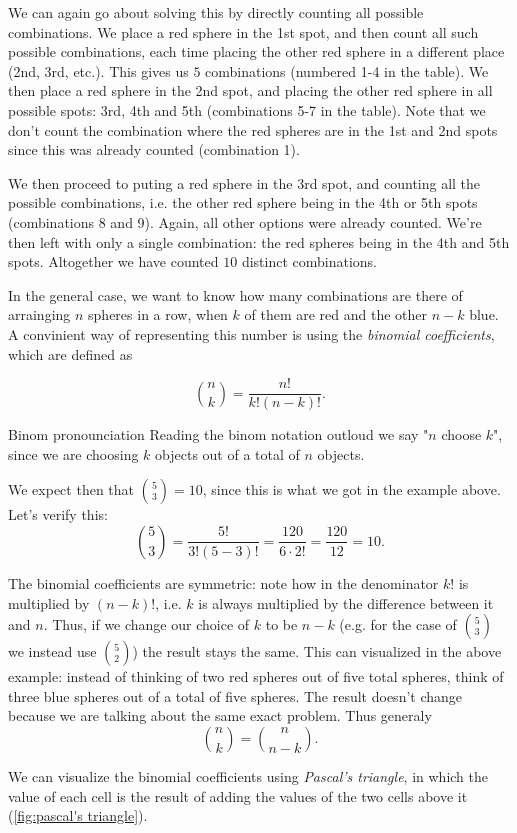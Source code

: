 We can again go about solving this by directly counting all possible combinations. We place a red sphere in the 1st spot, and then count all such possible combinations, each time placing the other red sphere in a different place (2nd, 3rd, etc.). This gives us $5$ combinations (numbered 1-4 in the table). We then place a red sphere in the 2nd spot, and placing the other red sphere in all possible spots: 3rd, 4th and 5th (combinations 5-7 in the table). Note that we don't count the combination where the red spheres are in the 1st and 2nd spots since this was already counted (combination 1).

We then proceed to puting a red sphere in the 3rd spot, and counting all the possible combinations, i.e. the other red sphere being in the 4th or 5th spots (combinations 8 and 9). Again, all other options were already counted. We're then left with only a single combination: the red spheres being in the 4th and 5th spots. Altogether we have counted $10$ distinct combinations.

In the general case, we want to know how many combinations are there of arrainging $n$ spheres in a row, when $k$ of them are red and the other $n-k$ blue. A convinient way of representing this number is using the \emph{binomial coefficients}, which are defined as

\begin{equation}
	\binom{n}{k} = \frac{n!}{k!(n-k)!}.
	\label{eq:binom_def}
\end{equation}

\begin{note}{Binom pronounciation}{}
	Reading the binom notation outloud we say "$n$ choose $k$", since we are choosing $k$ objects out of a total of $n$ objects.
\end{note}

We expect then that $\binom{5}{3}=10$, since this is what we got in the example above. Let's verify this:
\[
	\binom{5}{3} = \frac{5!}{3!(5-3)!} = \frac{120}{6\cdot2!} = \frac{120}{12} = 10.
\]

The binomial coefficients are symmetric: note how in the denominator $k!$ is multiplied by $(n-k)!$, i.e. $k$ is always multiplied by the difference between it and $n$. Thus, if we change our choice of $k$ to be $n-k$ (e.g. for the case of $\binom{5}{3}$ we instead use $\binom{5}{2}$) the result stays the same. This can visualized in the above example: instead of thinking of two red spheres out of five total spheres, think of three blue spheres out of a total of five spheres. The result doesn't change because we are talking about the same exact problem. Thus generaly
\[
	\binom{n}{k} = \binom{n}{n-k}.
\]

We can visualize the binomial coefficients using \emph{Pascal's triangle}, in which the value of each cell is the result of adding the values of the two cells above it (\autoref{fig:pascal's triangle}).

